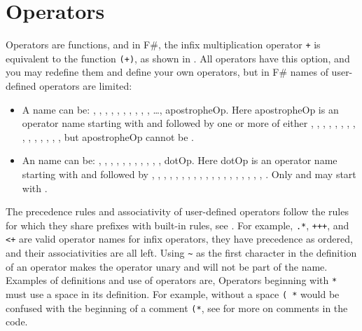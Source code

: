 \documentclass[fsharpnotes.tex]{subfiles}
\begin{document}
\section{Operators}
\label{sec:operators}
Operators are functions, and in F\#, the infix multiplication operator \lstinline!+! is equivalent to the function \lstinline!(+)!, as shown in .
%
%
All operators have this option, and you may redefine them and define your own operators, but in F\# names of user-defined operators are limited:
\begin{itemize}
\item A  name can be: \lexeme{+}, \lexeme{-}, , , \lexeme{\%}, \lexeme{\&}, \lexeme{\&\&}, \lexeme{\~\~}, \lexeme{\~\~\~}, \lexeme{\~\~\~\~}, \dots, apostropheOp. Here apostropheOp is an operator name starting with \lexeme{!} and followed by one or more of either \lexeme{!}, \lexeme{\%}, \lexeme{\&}, \lexeme{*}, \lexeme{+}, \lexeme{-}, , \lexeme{/}, \lexeme{<}, \lexeme{=}, \lexeme{>}, , \lexeme{^}, \lexeme{|}, \lexeme{\~}, but apostropheOp cannot be \lexeme{!=}.
\item An  name can be: \lexeme{+}, \lexeme{-}, , , \lexeme{\%}, \lexeme{\&}, \lexeme{\&\&}, \lexeme{:=}, \lexeme{::}, \lexeme{\$}, , dotOp. Here dotOp is an operator name starting with  and followed by \lexeme{+}, \lexeme{-}, , , \lexeme{\%}, \lexeme{\&}, \lexeme{\&\&}, \lexeme{-}, \lexeme{+}, \lexeme{\|\|}, \lexeme{<}, \lexeme{>}, \lexeme{=}, \lexeme{\|}, \lexeme{\&}, \lexeme{\^}, \lexeme{*}, \lexeme{/}, \lexeme{\%}, \lexeme{!=}. Only  and  may start with .
  \end{itemize}
  The precedence rules and associativity of user-defined operators follow the rules for which they share prefixes with built-in rules, see .
For example, \lstinline!.*!, \lstinline!+++!, and \lstinline!<+! are valid operator names for infix operators, they have precedence as ordered, and their associativities are all left. Using \lstinline!~! as the first character in the definition of an operator makes the operator unary and will not be part of the name. Examples of definitions and use of operators are,
%
%
Operators beginning with \lstinline!*! must use a space in its definition. For example, without a space \lstinline!( *! would be confused with the beginning of a comment \lstinline!(*!, see  for more on comments in the code.
\end{document}
